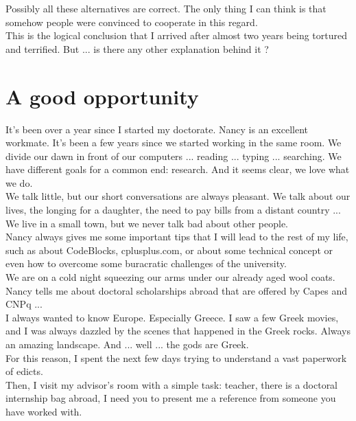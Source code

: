\documentclass[11pt]{book}
\begin{document}
\noindent Possibly all these alternatives are correct. The only thing I can think is that somehow people were convinced to cooperate in this regard. \\

\noindent This is the logical conclusion that I arrived after almost two years being tortured and terrified. But ... is there any other explanation behind it ?

\chapter{A good opportunity}

\noindent It's been over a year since I started my doctorate. Nancy is an excellent workmate. It's been a few years since we started working in the same room. We divide our dawn in front of our computers ... reading ... typing ... searching. We have different goals for a common end: research. And it seems clear, we love what we do. \\

\noindent We talk little, but our short conversations are always pleasant. We talk about our lives, the longing for a daughter, the need to pay bills from a distant country ... We live in a small town, but we never talk bad about other people. \\

\noindent Nancy always gives me some important tips that I will lead to the rest of my life, such as about CodeBlocks, cplusplus.com, or about some technical concept or even how to overcome some buracratic challenges of the university. \\

\noindent We are on a cold night squeezing our arms under our already aged wool coats. Nancy tells me about doctoral scholarships abroad that are offered by Capes and CNPq ... \\

\noindent I always wanted to know Europe. Especially Greece. I saw a few Greek movies, and I was always dazzled by the scenes that happened in the Greek rocks. Always an amazing landscape. And ... well ... the gods are Greek. \\

\noindent For this reason, I spent the next few days trying to understand a vast paperwork of edicts. \\

\noindent Then, I visit my advisor's room with a simple task: teacher, there is a doctoral internship bag abroad, I need you to present me a reference from someone you have worked with. \\
\end{document}
